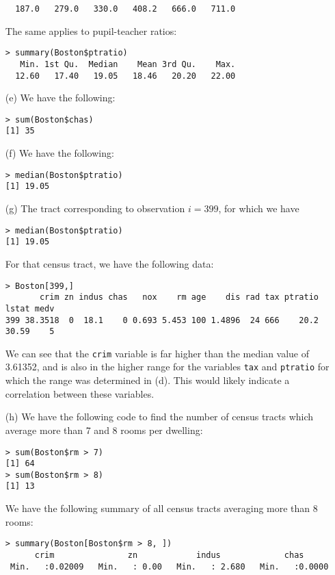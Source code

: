 \begin{itemize}
\begin{verbatim}
  187.0   279.0   330.0   408.2   666.0   711.0
    \end{verbatim}\normalsize
    The same applies to pupil-teacher ratios:
    \scriptsize\begin{verbatim}
> summary(Boston$ptratio)
   Min. 1st Qu.  Median    Mean 3rd Qu.    Max.
  12.60   17.40   19.05   18.46   20.20   22.00
    \end{verbatim}\normalsize
    \item[(e)]
    We have the following:
    \scriptsize\begin{verbatim}
> sum(Boston$chas)
[1] 35
    \end{verbatim}\normalsize
    \item[(f)]
    We have the following:
    \scriptsize\begin{verbatim}
> median(Boston$ptratio)
[1] 19.05
    \end{verbatim}\normalsize
    \item[(g)]
    The tract corresponding to observation $i = 399$, for which we have
    \scriptsize\begin{verbatim}
> median(Boston$ptratio)
[1] 19.05
    \end{verbatim}\normalsize
    For that census tract, we have the following data:
    \scriptsize\begin{verbatim}
> Boston[399,]
       crim zn indus chas   nox    rm age    dis rad tax ptratio lstat medv
399 38.3518  0  18.1    0 0.693 5.453 100 1.4896  24 666    20.2 30.59    5
    \end{verbatim}\normalsize
    We can see that the \verb|crim| variable is far higher than the median 
    value of 3.61352, and is also in the higher range for the variables
    \verb|tax| and \verb|ptratio| for which the range was determined in (d).
    This would likely indicate a correlation between these variables.
    \item[(h)]
    We have the following code to find the number of census tracts which
    average more than 7 and 8 rooms per dwelling:
    \scriptsize\begin{verbatim}
> sum(Boston$rm > 7)
[1] 64
> sum(Boston$rm > 8)
[1] 13
    \end{verbatim}\normalsize
    We have the following summary of all census tracts averaging more than 8
    rooms:
    \scriptsize\begin{verbatim}
> summary(Boston[Boston$rm > 8, ])
      crim               zn            indus             chas
 Min.   :0.02009   Min.   : 0.00   Min.   : 2.680   Min.   :0.0000

\end{verbatim}
\end{itemize}
